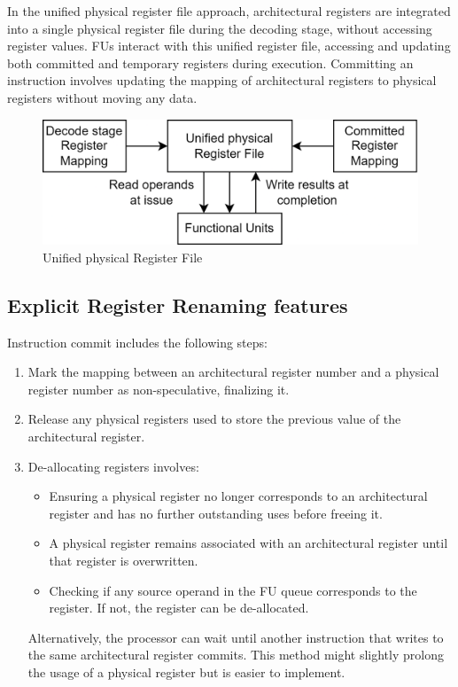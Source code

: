In the unified physical register file approach, architectural registers are integrated into a single physical register file during the decoding stage, without accessing register values. 
FUs interact with this unified register file, accessing and updating both committed and temporary registers during execution. 
Committing an instruction involves updating the mapping of architectural registers to physical registers without moving any data.
\begin{figure}[H]
    \centering
    \includegraphics[width=0.5\linewidth]{images/uprf.png}
    \caption{Unified physical Register File}
\end{figure}

\subsection{Explicit Register Renaming features}
Instruction commit includes the following steps:
\begin{enumerate}
    \item Mark the mapping between an architectural register number and a physical register number as non-speculative, finalizing it.
    \item Release any physical registers used to store the previous value of the architectural register.
    \item De-allocating registers involves:
        \begin{itemize}
            \item Ensuring a physical register no longer corresponds to an architectural register and has no further outstanding uses before freeing it.
            \item A physical register remains associated with an architectural register until that register is overwritten.
            \item Checking if any source operand in the FU queue corresponds to the register. If not, the register can be de-allocated.
        \end{itemize}
        Alternatively, the processor can wait until another instruction that writes to the same architectural register commits. 
        This method might slightly prolong the usage of a physical register but is easier to implement.
\end{enumerate}

